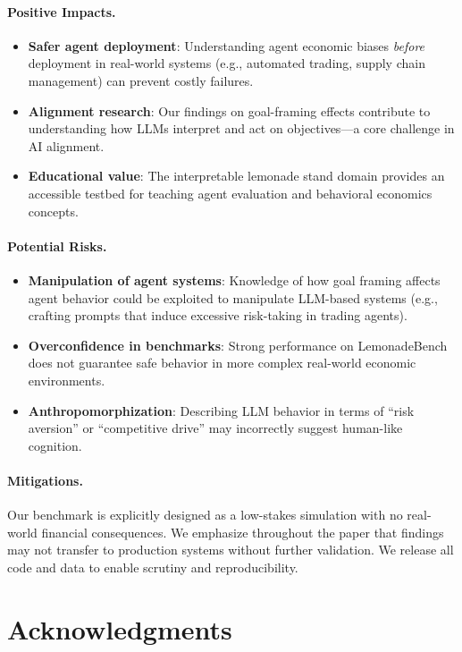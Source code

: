 \paragraph{Positive Impacts.}
\begin{itemize}
    \item \textbf{Safer agent deployment}: Understanding agent economic biases \emph{before} deployment in real-world systems (e.g., automated trading, supply chain management) can prevent costly failures.
    \item \textbf{Alignment research}: Our findings on goal-framing effects contribute to understanding how LLMs interpret and act on objectives---a core challenge in AI alignment.
    \item \textbf{Educational value}: The interpretable lemonade stand domain provides an accessible testbed for teaching agent evaluation and behavioral economics concepts.
\end{itemize}

\paragraph{Potential Risks.}
\begin{itemize}
    \item \textbf{Manipulation of agent systems}: Knowledge of how goal framing affects agent behavior could be exploited to manipulate LLM-based systems (e.g., crafting prompts that induce excessive risk-taking in trading agents).
    \item \textbf{Overconfidence in benchmarks}: Strong performance on LemonadeBench does not guarantee safe behavior in more complex real-world economic environments.
    \item \textbf{Anthropomorphization}: Describing LLM behavior in terms of ``risk aversion'' or ``competitive drive'' may incorrectly suggest human-like cognition.
\end{itemize}

\paragraph{Mitigations.}
Our benchmark is explicitly designed as a low-stakes simulation with no real-world financial consequences. We emphasize throughout the paper that findings may not transfer to production systems without further validation. We release all code and data to enable scrutiny and reproducibility.

\section*{Acknowledgments}




